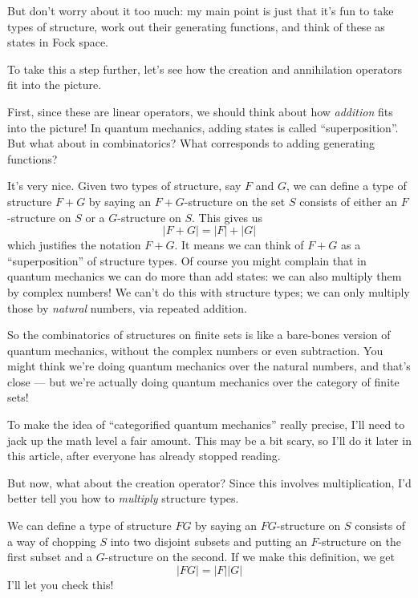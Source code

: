 \documentclass{article}
\def\tightlist{}
\renewcommand{\texttt}[1]{%
  \begingroup
  \ttfamily
  \begingroup\lccode`~=`/\lowercase{\endgroup\def~}{/\discretionary{}{}{}}%
  \begingroup\lccode`~=`[\lowercase{\endgroup\def~}{[\discretionary{}{}{}}%
  \begingroup\lccode`~=`.\lowercase{\endgroup\def~}{.\discretionary{}{}{}}%
  \catcode`/=\active\catcode`[=\active\catcode`.=\active
  \scantokens{#1\noexpand}%
  \endgroup
}
\begin{document}

But don't worry about it too much: my main point is just that it's fun
to take types of structure, work out their generating functions, and
think of these as states in Fock space.

To take this a step further, let's see how the creation and annihilation
operators fit into the picture.

First, since these are linear operators, we should think about how
\emph{addition} fits into the picture! In quantum mechanics, adding
states is called ``superposition''. But what about in combinatorics?
What corresponds to adding generating functions?

It's very nice. Given two types of structure, say \(F\) and \(G\), we
can define a type of structure \(F+G\) by saying an \(F+G\)-structure on
the set \(S\) consists of either an \(F\)-structure on \(S\) or a
\(G\)-structure on \(S\). This gives us \[|F+G| = |F| + |G|\] which
justifies the notation \(F+G\). It means we can think of \(F+G\) as a
``superposition'' of structure types. Of course you might complain that
in quantum mechanics we can do more than add states: we can also
multiply them by complex numbers! We can't do this with structure types;
we can only multiply those by \emph{natural} numbers, via repeated
addition.

So the combinatorics of structures on finite sets is like a bare-bones
version of quantum mechanics, without the complex numbers or even
subtraction. You might think we're doing quantum mechanics over the
natural numbers, and that's close --- but we're actually doing quantum
mechanics over the category of finite sets!

To make the idea of ``categorified quantum mechanics'' really precise,
I'll need to jack up the math level a fair amount. This may be a bit
scary, so I'll do it later in this article, after everyone has already
stopped reading.

But now, what about the creation operator? Since this involves
multiplication, I'd better tell you how to \emph{multiply} structure
types.

We can define a type of structure \(FG\) by saying an \(FG\)-structure
on \(S\) consists of a way of chopping \(S\) into two disjoint subsets
and putting an \(F\)-structure on the first subset and a \(G\)-structure
on the second. If we make this definition, we get \[|FG| = |F| |G|\]
I'll let you check this!
\end{document}
